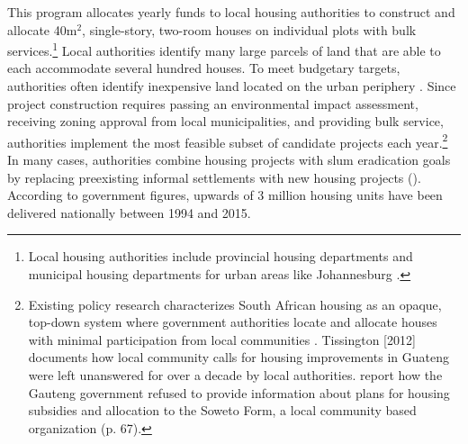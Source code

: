 \documentclass[12pt]{article}
\begin{document}
This program allocates yearly funds to local housing authorities to construct and allocate 40m$^2$, single-story, two-room houses on individual plots with bulk services.\footnote{Local housing authorities include provincial housing departments and municipal housing departments for urban areas like Johannesburg \citep{dhsreports}.}  Local authorities identify many large parcels of land that are able to each accommodate several hundred houses.  To meet budgetary targets, authorities often identify inexpensive land located on the urban periphery \citep{beninterview,dhsreports}.  Since project construction requires passing an environmental impact assessment, receiving zoning approval from local municipalities, and providing bulk service, authorities implement the most feasible subset of candidate projects each year.\footnote{Existing policy research characterizes South African housing as an opaque, top-down system where government authorities locate and allocate houses with minimal participation from local communities \citep{seriq}.  Tissington [2012] documents how local community calls for housing improvements in Guateng were left unanswered for over a decade by local authorities.  \cite{seriq} report how the Gauteng government refused to provide information about plans for housing subsidies and allocation to the Soweto Form, a local community based organization (p. 67).}  In many cases, authorities combine housing projects with slum eradication goals by replacing preexisting informal settlements with new housing projects (\cite{hofmeyr2008risk}).  According to government figures, upwards of 3 million housing units have been delivered nationally between 1994 and 2015.













\end{document}
